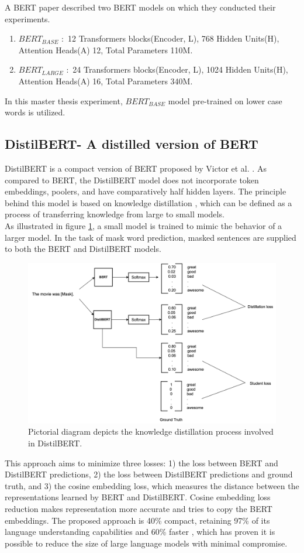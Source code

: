 \documentclass[%
	BCOR=8mm, %
	DIV=12,
	toc=bibliography, %
	toc=listof, %
	oneside, %
	egregdoesnotlikesansseriftitles, %
	]{scrbook}
\begin{document}
A BERT paper \cite{devlin_bert_2019-1} described two BERT models on which they conducted their experiments. 
\begin{enumerate}
    \item $BERT_{BASE}$ $:$ 12 Transformers blocks(Encoder, L), 768 Hidden Units(H), Attention Heads(A) 12, Total Parameters 110M.
    \item $BERT_{LARGE}$ $:$ 24 Transformers blocks(Encoder, L), 1024 Hidden Units(H), Attention Heads(A) 16, Total Parameters 340M.
\end{enumerate}
In this master thesis experiment, $BERT_{BASE}$ model  pre-trained on lower case words is utilized. 

\subsection{DistilBERT- A distilled version of BERT}
DistilBERT is a compact version of BERT proposed by Victor et al. \cite{sanh_distilbert_2020}. As compared to BERT, the DistilBERT model does not incorporate token embeddings, poolers, and have comparatively half hidden layers. The principle behind this model is based on knowledge distillation \cite{hinton_distilling_2015}, which can be defined as a process of transferring knowledge from large  to small models. \\
As illustrated in figure \ref{fig:DistilBERT}, a small model is trained to mimic the behavior of a larger model. In the task of mask word prediction, masked sentences are supplied to both the BERT and DistilBERT models.
\begin{figure}[H]
    \centering
    \includegraphics[width=0.8\linewidth]{img/DistilBERT.png}
    \caption[Diagram of DistilBERT training.]{ Pictorial diagram depicts the knowledge distillation process involved in  DistilBERT.}
    \label{fig:DistilBERT}
\end{figure}
This approach aims to minimize three losses: 1) the loss between BERT and DistilBERT predictions, 2) the loss between DistilBERT predictions and ground truth, and 3) the cosine embedding loss, which measures the distance between the representations learned by BERT and DistilBERT. Cosine embedding loss reduction makes representation more accurate and tries to copy the BERT embeddings. The proposed approach is 40\% compact, retaining 97\% of its language understanding capabilities and 60\% faster \cite{sanh_distilbert_2020} , which has proven it is possible to reduce the size of large language models with minimal compromise.
\end{document}
